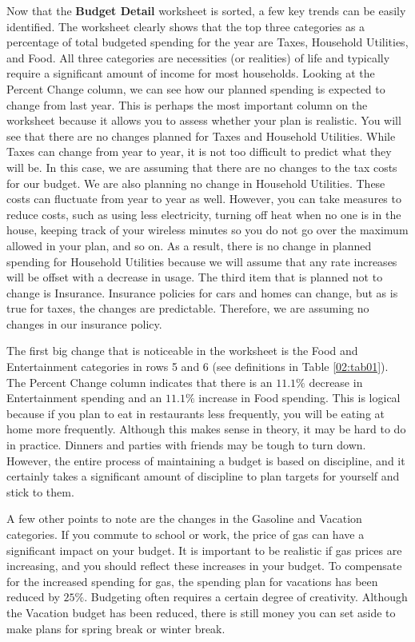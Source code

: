Now that the \textbf{Budget Detail} worksheet is sorted, a few key trends can be easily identified. The worksheet clearly shows that the top three categories as a percentage of total budgeted spending for the year are Taxes, Household Utilities, and Food. All three categories are necessities (or realities) of life and typically require a significant amount of income for most households. Looking at the Percent Change column, we can see how our planned spending is expected to change from last year. This is perhaps the most important column on the worksheet because it allows you to assess whether your plan is realistic. You will see that there are no changes planned for Taxes and Household Utilities. While Taxes can change from year to year, it is not too difficult to predict what they will be. In this case, we are assuming that there are no changes to the tax costs for our budget. We are also planning no change in Household Utilities. These costs can fluctuate from year to year as well. However, you can take measures to reduce costs, such as using less electricity, turning off heat when no one is in the house, keeping track of your wireless minutes so you do not go over the maximum allowed in your plan, and so on. As a result, there is no change in planned spending for Household Utilities because we will assume that any rate increases will be offset with a decrease in usage. The third item that is planned not to change is Insurance. Insurance policies for cars and homes can change, but as is true for taxes, the changes are predictable. Therefore, we are assuming no changes in our insurance policy.

The first big change that is noticeable in the worksheet is the Food and Entertainment categories in rows 5 and 6 (see definitions in Table \ref{02:tab01}). The Percent Change column indicates that there is an $ 11.1\% $ decrease in Entertainment spending and an $ 11.1\% $ increase in Food spending. This is logical because if you plan to eat in restaurants less frequently, you will be eating at home more frequently. Although this makes sense in theory, it may be hard to do in practice. Dinners and parties with friends may be tough to turn down. However, the entire process of maintaining a budget is based on discipline, and it certainly takes a significant amount of discipline to plan targets for yourself and stick to them.

A few other points to note are the changes in the Gasoline and Vacation categories. If you commute to school or work, the price of gas can have a significant impact on your budget. It is important to be realistic if gas prices are increasing, and you should reflect these increases in your budget. To compensate for the increased spending for gas, the spending plan for vacations has been reduced by $ 25\% $. Budgeting often requires a certain degree of creativity. Although the Vacation budget has been reduced, there is still money you can set aside to make plans for spring break or winter break.

